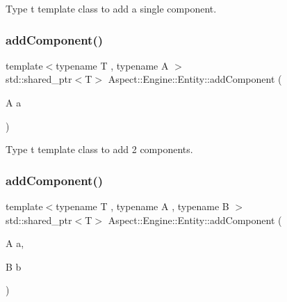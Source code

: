 Type t template class to add a single component. 

\mbox{\label{class_aspect_1_1_engine_1_1_entity_aac44f29e1ad32261d7853e59a7562671}} 
\subsubsection{\texorpdfstring{add\+Component()}{addComponent()}\hspace{0.1cm}{\footnotesize\ttfamily [2/3]}}
{\footnotesize\ttfamily template$<$typename T , typename A $>$ \\
std\+::shared\+\_\+ptr$<$T$>$ Aspect\+::\+Engine\+::\+Entity\+::add\+Component (\begin{DoxyParamCaption}\item[{A}]{a }\end{DoxyParamCaption})\hspace{0.3cm}{\ttfamily [inline]}}



Type t template class to add 2 components. 

\mbox{\label{class_aspect_1_1_engine_1_1_entity_a73a023e500fddd340cf843e6e11796dd}} 
\subsubsection{\texorpdfstring{add\+Component()}{addComponent()}\hspace{0.1cm}{\footnotesize\ttfamily [3/3]}}
{\footnotesize\ttfamily template$<$typename T , typename A , typename B $>$ \\
std\+::shared\+\_\+ptr$<$T$>$ Aspect\+::\+Engine\+::\+Entity\+::add\+Component (\begin{DoxyParamCaption}\item[{A}]{a,  }\item[{B}]{b }\end{DoxyParamCaption})\hspace{0.3cm}{\ttfamily [inline]}}



